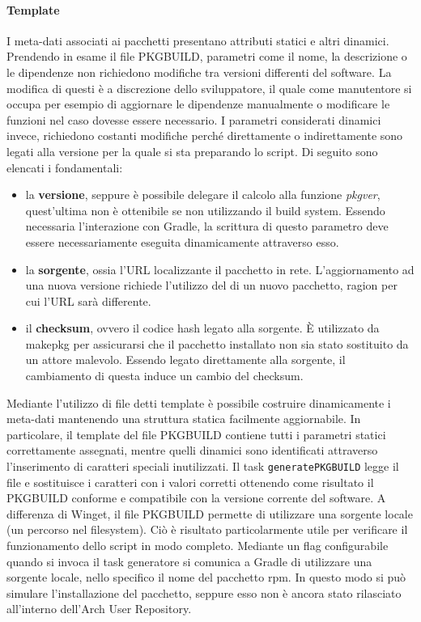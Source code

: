 \paragraph{Template} I meta-dati associati ai pacchetti presentano attributi statici e altri dinamici. Prendendo in esame il file PKGBUILD, parametri come il nome, la descrizione o le dipendenze non richiedono modifiche tra versioni differenti del software. La modifica di questi è a discrezione dello sviluppatore, il quale come manutentore si occupa per esempio di aggiornare le dipendenze manualmente o modificare le funzioni nel caso dovesse essere necessario. I parametri considerati dinamici invece, richiedono costanti modifiche perché direttamente o indirettamente sono legati alla versione per la quale si sta preparando lo script. Di seguito sono elencati i fondamentali:
\begin{itemize}
	\item la \textbf{versione}, seppure è possibile delegare il calcolo alla funzione \textit{pkgver}, quest'ultima non è ottenibile se non utilizzando il build system. Essendo necessaria l'interazione con Gradle, la scrittura di questo parametro deve essere necessariamente eseguita dinamicamente attraverso esso.
	\item la \textbf{sorgente}, ossia l'URL localizzante il pacchetto in rete. L'aggiornamento ad una nuova versione richiede l'utilizzo del di un nuovo pacchetto, ragion per cui l'URL sarà differente.
	\item il \textbf{checksum}, ovvero il codice hash legato alla sorgente. È utilizzato da makepkg per assicurarsi che il pacchetto installato non sia stato sostituito da un attore malevolo. Essendo legato direttamente alla sorgente, il cambiamento di questa induce un cambio del checksum.
\end{itemize}
Mediante l'utilizzo di file detti template è possibile costruire dinamicamente i meta-dati mantenendo una struttura statica facilmente aggiornabile. In particolare, il template del file PKGBUILD contiene tutti i parametri statici correttamente assegnati, mentre quelli dinamici sono identificati attraverso l'inserimento di caratteri speciali inutilizzati. Il task \texttt{generatePKGBUILD} legge il file e sostituisce i caratteri con i valori corretti ottenendo come risultato il PKGBUILD conforme e compatibile con la versione corrente del software. A differenza di Winget, il file PKGBUILD permette di utilizzare una sorgente locale (un percorso nel filesystem). Ciò è risultato particolarmente utile per verificare il funzionamento dello script in modo completo. Mediante un flag configurabile quando si invoca il task generatore si comunica a Gradle di utilizzare una sorgente locale, nello specifico il nome del pacchetto rpm. In questo modo si può simulare l'installazione del pacchetto, seppure esso non è ancora stato rilasciato all'interno dell'Arch User Repository.


